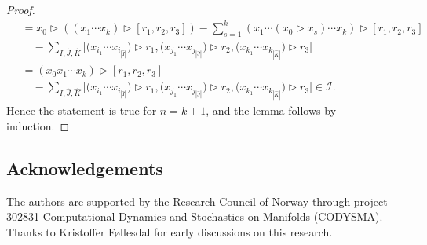 \documentclass[pdftex]{sigma}
\numberwithin{equation}{section}
\begin{document}
\begin{proof}
\begin{gather*}
 \quad {}= x_0 \rhd ( (x_1 \cdots x_k) \rhd [r_1, r_2, r_3]) - \sum_{s=1}^k (x_1 \cdots (x_0 \rhd x_s) \cdots x_k) \rhd [r_1, r_2, r_3] \\
 \qquad {}- \sum_{\hat{I},\hat{J},\hat{K}} \bigl[\bigl(x_{i_1} \cdots x_{i_{|\hat{I}|}}\bigr) \rhd r_1, \bigl(x_{j_1} \cdots x_{j_{|\hat{J}|}}\bigr) \rhd r_2, \bigl(x_{k_1} \cdots x_{k_{|\hat{K}|}}\bigr) \rhd r_3\bigr] \\
 \quad {}= (x_0x_1 \cdots x_k) \rhd [r_1, r_2, r_3] \\
 \qquad {}- \sum_{\hat{I},\hat{J},\hat{K}} \bigl[\bigr(x_{i_1} \cdots x_{i_{|\hat{I}|}}\bigr) \rhd r_1, \bigl(x_{j_1} \cdots x_{j_{|\hat{J}|}}\bigr) \rhd r_2, \bigl(x_{k_1} \cdots x_{k_{|\hat{K}|}}\bigr) \rhd r_3\bigr] \in \mathcal{I}.
\end{gather*}
Hence the statement is true for $n=k+1$, and the lemma follows by induction.
\end{proof}

\subsection*{Acknowledgements}
The authors are supported by the Research Council of Norway through project 302831 Computational Dynamics and Stochastics on Manifolds (CODYSMA). Thanks to Kristoffer F{\o}llesdal for early discussions on this research.
\end{document}
